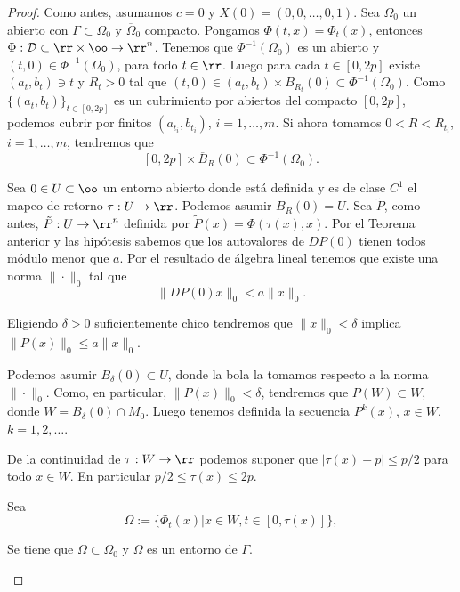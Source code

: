 \begin{proof} Como antes, asumamos $c=0$ y $X(0)=(0,0,\ldots,0,1)$. Sea $\Omega_0$ un abierto con $\Gamma\subset\Omega_0$ y $\overline{\Omega}_0$ compacto. Pongamos
$\Phi(t,x)=\Phi_t(x)$, entonces $\Phi:\mathcal{D}\subset\rr\times \oo\to\rr^n$. Tenemos que $\Phi^{-1}(\Omega_0)$ es un abierto y $(t,0)\in\Phi^{-1}(\Omega_0)$, para todo 
$t\in\rr$. Luego para cada $t\in[0,2p]$ existe $(a_t,b_t)\ni t$ y $R_t>0$ tal que $(t,0)\in(a_t,b_t)\times B_{R_t}(0)\subset\Phi^{-1}(\Omega_0)$. Como $\{(a_t,b_t)\}_{t\in[0,2p]}$
es un cubrimiento por abiertos del compacto $[0,2p]$, podemos cubrir por finitos $(a_{t_i},b_{t_i})$, $i=1,\ldots,m$. Si ahora tomamos $0<R< R_{t_i}$, $i=1,\ldots,m$, 
tendremos que
\[[0,2p]\times\overline{B}_{R}(0)\subset\Phi^{-1}(\Omega_0).\]





Sea $0\in U\subset\oo$ un entorno abierto donde está definida y es de clase $C^1$ el mapeo de retorno $\tau:U\to\rr$. Podemos asumir $B_R(0)= U$. Sea $\tilde{P}$, como antes, 
$\tilde{P}:U\to\rr^n$ definida por $\tilde{P}(x)=\Phi(\tau(x),x)$. Por el Teorema anterior y las hipótesis sabemos que los autovalores de $DP(0)$ tienen todos módulo menor que
$a$. Por el resultado de álgebra lineal tenemos que existe una norma $\|\cdot\|_0$ tal que
\[\|DP(0)x\|_0<a\|x\|_0.\]

\begin{ejercicio} Eligiendo $\delta>0$ suficientemente chico tendremos que  $\|x\|_0<\delta$ implica $\|P(x)\|_0\leq a\|x\|_0$. 
 
\end{ejercicio}


Podemos asumir $B_{\delta}(0)\subset U$, donde la bola la tomamos respecto a la norma $\|\cdot\|_0$. Como, en particular, $\|P(x)\|_0<\delta$, tendremos que $P(W)\subset W$,
donde $W=B_{\delta}(0)\cap M_0$. Luego tenemos definida la secuencia $P^k(x)$, $x\in W$, $k=1,2,\ldots$. 






De la continuidad de $\tau:W\to\rr$ podemos suponer que $|\tau(x)-p|\leq p/2$ para todo $x\in W$. En particular $p/2\leq \tau(x)\leq 2p$. 

Sea 
\[\Omega:=\{\Phi_t(x)|x\in W, t\in [0,\tau(x)]\},\]

\begin{ejercicio}
 Se tiene que $\Omega\subset \Omega_0$ y $\Omega$ es un entorno de $\Gamma$.
\end{ejercicio}






\end{proof}
